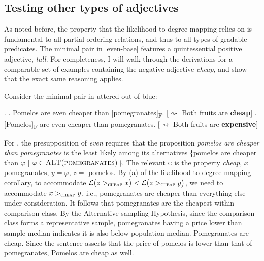 \documentclass[12pt,letterpaper]{scrartcl}
\newcommand{\alignright}{\hspace*{\fill}}
\newcommand{\infer}{$\rightsquigarrow$ }
\newcommand{\sub}[1]{\textsubscript{#1}}
\begin{document}

\subsection{Testing other types of adjectives}

As noted before, the property that the likelihood-to-degree mapping relies on is fundamental to all partial ordering relations, and thus to all types of gradable predicates. The minimal pair in \ref{even-base} features a quintessential positive adjective, \textit{tall}. For completeness, I will walk through the derivations for a comparable set of examples containing the negative adjective \textit{cheap}, and show that the exact same reasoning applies.

Consider the minimal pair in \Next uttered out of blue:

\ex. \a. Pomelos are even cheaper than [pomegranates]\sub{F}. \alignright [\infer Both fruits are \textbf{cheap}]
\b. [Pomelos]\sub{F} are even cheaper than pomegranates. \alignright [\infer Both fruits are \textbf{expensive}]


For \Last[a], the presupposition of \textit{even} requires that the proposition \textit{pomelos are cheaper than pomegranates} is the least likely among its alternatives \{pomelos are cheaper than $\varphi$ | $\varphi \in \linebreak \textsc{ALT(pomegranates)} $\}. The relevant \textsc{g} is the property \textit{cheap}, $x = $ pomegranates, $y = \varphi$, $z = $ pomelos. By (a) of the likelihood-to-degree mapping corollary, to accommodate $\mathcal{L}\big( z >_\textsc{cheap} x \big) < \mathcal{L}\big( z >_\textsc{cheap} y\big)$, we need to accommodate $x >_\textsc{cheap} y$, i.e., pomegranates are cheaper than everything else under consideration. It follows that pomegranates are the cheapest within comparison class. By the Alternative-sampling Hypothesis, since the comparison class forms a representative sample, pomegranates having a price lower than sample median indicates it is also below population median. Pomegranates are cheap. Since the sentence asserts that the price of pomelos is lower than that of pomegranates, Pomelos are cheap as well.
\end{document}
